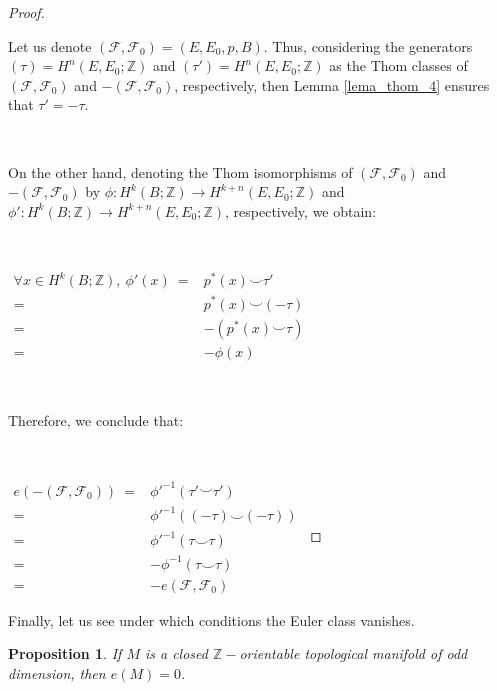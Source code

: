 \documentclass[12pt,oneside]{book}
\newtheorem{prop}   {Proposition}[chapter]
\newcommand{\Z}{\mathbb{Z}}
\newcommand{\ccup}{\smile}
\begin{document}
    \begin{proof}

        \

    	Let us denote $(\mathcal{F},\mathcal{F}_{0}) = (E,E_{0},p,B)$. Thus, considering the generators $(\tau) = H^{n}(E,E_{0};\Z)$ and 
        $(\tau') = H^{n}(E,E_{0};\Z)$ as the Thom classes of $(\mathcal{F},\mathcal{F}_{0})$ and 
        $-(\mathcal{F},\mathcal{F}_{0})$, respectively, then Lemma \ref{lema_thom_4} ensures that $\tau' = -\tau$.

        \

    	On the other hand, denoting the Thom isomorphisms of $(\mathcal{F},\mathcal{F}_{0})$ and 
        $-(\mathcal{F},\mathcal{F}_{0})$ by $\phi: H^{k}(B;\Z) \to H^{k+n}(E,E_{0};\Z)$ and $\phi': H^{k}(B;\Z) \to H^{k+n}(E,E_{0};\Z)$, 
        respectively, we obtain:

        \
    
    	$\begin{array}{rl}
    		\forall x \in H^{k}(B;\Z), \ \phi'(x) \ = & p^{*}(x) \ccup \tau' \\
    		= & p^{*}(x) \ccup (-\tau) \\
    		= & -\left( p^{*}(x) \ccup \tau \right) \\
    		= & -\phi(x)
    	\end{array}$

        \

    	Therefore, we conclude that:

    	\

    	$\begin{array}{rl}
    		e\left( -(\mathcal{F},\mathcal{F}_{0}) \right) \ = & \phi'^{-1}(\tau' \ccup \tau') \\
    		= & \phi'^{-1}((-\tau) \ccup (-\tau)) \\
    		= & \phi'^{-1}(\tau \ccup \tau) \\
    		= & -\phi^{-1}(\tau \ccup \tau) \\
    		= & -e(\mathcal{F},\mathcal{F}_{0})
    	\end{array}$

    \end{proof}

    Finally, let us see under which conditions the Euler class vanishes.

    \begin{prop}\label{prop_nulidade_euler}
    	If $M$ is a closed $\Z-$orientable topological manifold of odd dimension, then $e(M) = 0$.
    \end{prop}
\end{document}
